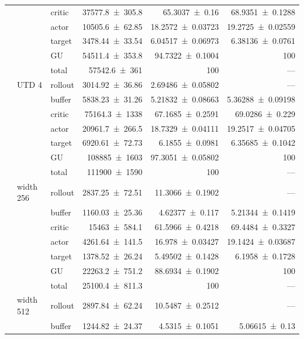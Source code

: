 {\begin{longtable}{@{}lllrrr@{}}
     &  & critic & \num{37577.8+-305.8} & \num{65.3037+-0.16} & \num{68.9351+-0.1288} \\
     &  & actor & \num{10505.6+-62.85} & \num{18.2572+-0.03723} & \num{19.2725+-0.02559} \\
     &  & target & \num{3478.44+-33.54} & \num{6.04517+-0.06973} & \num{6.38136+-0.0761} \\
     &  & GU & \num{54511.4+-353.8} & \num{94.7322+-0.1004} & 100 \\
     &  & total & \num{57542.6+-361} & \num{100} & --- \\
    \addlinespace[2pt]
     & UTD 4 & rollout & \num{3014.92+-36.86} & \num{2.69486+-0.05802} & --- \\
     &  & buffer & \num{5838.23+-31.26} & \num{5.21832+-0.08663} & \num{5.36288+-0.09198} \\
     &  & critic & \num{75164.3+-1338} & \num{67.1685+-0.2591} & \num{69.0286+-0.229} \\
     &  & actor & \num{20961.7+-266.5} & \num{18.7329+-0.04111} & \num{19.2517+-0.04705} \\
     &  & target & \num{6920.61+-72.73} & \num{6.1855+-0.0981} & \num{6.35685+-0.1042} \\
     &  & GU & \num{108885+-1603} & \num{97.3051+-0.05802} & 100 \\
     &  & total & \num{111900+-1590} & \num{100} & --- \\
    \addlinespace[2pt]
     & width 256 & rollout & \num{2837.25+-72.51} & \num{11.3066+-0.1902} & --- \\
     &  & buffer & \num{1160.03+-25.36} & \num{4.62377+-0.117} & \num{5.21344+-0.1419} \\
     &  & critic & \num{15463+-584.1} & \num{61.5966+-0.4218} & \num{69.4484+-0.3327} \\
     &  & actor & \num{4261.64+-141.5} & \num{16.978+-0.03427} & \num{19.1424+-0.03687} \\
     &  & target & \num{1378.52+-26.24} & \num{5.49502+-0.1428} & \num{6.1958+-0.1728} \\
     &  & GU & \num{22263.2+-751.2} & \num{88.6934+-0.1902} & 100 \\
     &  & total & \num{25100.4+-811.3} & \num{100} & --- \\
    \addlinespace[2pt]
     & width 512 & rollout & \num{2897.84+-62.24} & \num{10.5487+-0.2512} & --- \\
     &  & buffer & \num{1244.82+-24.37} & \num{4.5315+-0.1051} & \num{5.06615+-0.13} \\

\end{longtable}}
